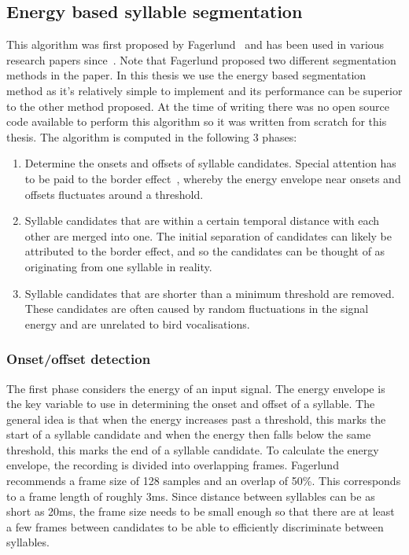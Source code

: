 \subsection{Energy based syllable segmentation}\label{ssec:syllable_seg}

This algorithm was first proposed by Fagerlund~\cite{fagerlund2004automatic} and
has been used in various research papers
since~\cite{somervuo2006parametric,ramashini2022robust}. Note that Fagerlund
proposed two different segmentation methods in the paper. In this thesis we use
the energy based segmentation method as it's relatively simple to implement and
its performance can be superior to the other method proposed. At the time of
writing there was no open source code available to perform this algorithm so it
was written from scratch for this thesis. The algorithm is computed in the
following 3 phases:

\begin{enumerate}

  \item Determine the onsets and offsets of syllable candidates. Special
    attention has to be paid to the border effect~\cite{li2001classification},
    whereby the energy envelope near onsets and offsets fluctuates around a
    threshold.

  \item Syllable candidates that are within a certain temporal distance with
    each other are merged into one. The initial separation of candidates can
    likely be attributed to the border effect, and so the candidates can be
    thought of as originating from one syllable in reality.

  \item Syllable candidates that are shorter than a minimum threshold are
    removed. These candidates are often caused by random fluctuations in the
    signal energy and are unrelated to bird vocalisations.

\end{enumerate}

\subsubsection{Onset/offset detection}

The first phase considers the energy of an input signal. The energy envelope is
the key variable to use in determining the onset and offset of a syllable. The
general idea is that when the energy increases past a threshold, this marks the
start of a syllable candidate and when the energy then falls below the same
threshold, this marks the end of a syllable candidate. To calculate the energy
envelope, the recording is divided into overlapping frames.
Fagerlund~\cite{fagerlund2004automatic} recommends a frame size of 128 samples
and an overlap of 50\%. This corresponds to a frame length of roughly 3ms. Since
distance between syllables can be as short as 20ms, the frame size needs to be
small enough so that there are at least a few frames between candidates to be
able to efficiently discriminate between syllables.

